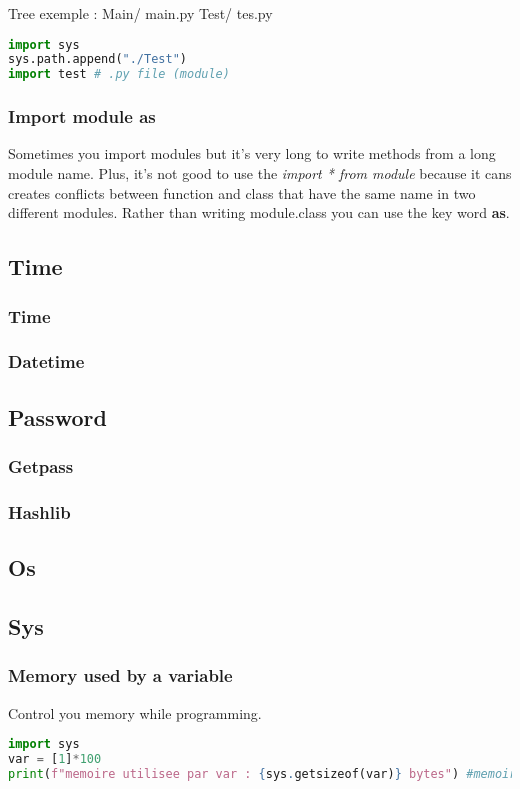 \documentclass[a4paper, 12pt]{article}
\begin{document}
Tree exemple :
Main/
	main.py
	Test/
		tes.py

\begin{lstlisting}[language=Python]
import sys
sys.path.append("./Test")
import test # .py file (module)
\end{lstlisting}

\subsubsection{Import module as}
Sometimes you import modules but it's very long to write methods from a long module name. Plus, it's not good to use the \textit{import * from module} because it cans creates conflicts between function and class that have the same name in two different modules. Rather than writing module.class you can use the key word \textbf{as}.
\label{As}

\subsection{Time}
\subsubsection{Time}
\subsubsection{Datetime}
\subsection{Password}
\subsubsection{Getpass}
\subsubsection{Hashlib}
\subsection{Os}

\subsection{Sys}
\subsubsection{Memory used by a variable}
Control you memory while programming. 
\begin{lstlisting}[language=Python]
import sys
var = [1]*100
print(f"memoire utilisee par var : {sys.getsizeof(var)} bytes") #memoire utilisee par var : 856 bytes
\end{lstlisting}
\end{document}
